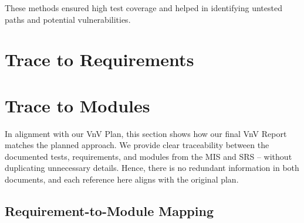 \documentclass[12pt, titlepage]{article}
\begin{document}
These methods ensured high test coverage and helped in identifying untested paths and potential vulnerabilities.

		
\section{Trace to Requirements}
		
\section{Trace to Modules}
\label{sec:TraceToModules}

In alignment with our VnV Plan, this section shows how our final VnV Report
matches the planned approach. We provide clear traceability between
the documented tests, requirements, and modules from the MIS and SRS –
without duplicating unnecessary details. Hence, there is no redundant
information in both documents, and each reference here aligns with the
original plan.

\subsection{Requirement-to-Module Mapping}
\end{document}
